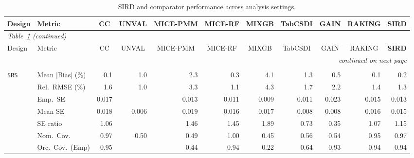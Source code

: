 \begin{landscape}
\footnotesize\setlength{\tabcolsep}{3.5pt}
\begin{longtable}{llrrrrrrrrr}
\caption{SIRD and comparator performance across analysis settings.}
\label{tab:appc_vccc_COX} \\
\toprule
Design & Metric & \multicolumn{1}{c}{CC} & \multicolumn{1}{c}{UNVAL} & \multicolumn{1}{c}{MICE-PMM} & \multicolumn{1}{c}{MICE-RF} & \multicolumn{1}{c}{MIXGB} & \multicolumn{1}{c}{TabCSDI} & \multicolumn{1}{c}{GAIN} & \multicolumn{1}{c}{RAKING} & \multicolumn{1}{c}{\textbf{SIRD}} \\
\midrule \endfirsthead
\multicolumn{11}{l}{\footnotesize\itshape Table~\ref{tab:appc_vccc_COX} (continued)} \\
\toprule
Design & Metric & \multicolumn{1}{c}{CC} & \multicolumn{1}{c}{UNVAL} & \multicolumn{1}{c}{MICE-PMM} & \multicolumn{1}{c}{MICE-RF} & \multicolumn{1}{c}{MIXGB} & \multicolumn{1}{c}{TabCSDI} & \multicolumn{1}{c}{GAIN} & \multicolumn{1}{c}{RAKING} & \multicolumn{1}{c}{\textbf{SIRD}} \\
\midrule \endhead
\midrule \multicolumn{11}{r}{\footnotesize\itshape continued on next page} \\
\endfoot
\bottomrule \endlastfoot
\multicolumn{11}{l}{\textbf{Continuous Phase-Two Covariates}} \\
\addlinespace[2pt]
\quad \texttt{SRS} & Mean $|$Bias$|$ (\%) & \cellcolor{rankone}0.1 & 1.0 & 2.3 & \cellcolor{rankthree}0.3 & 4.1 & 1.3 & 0.5 & \cellcolor{rankone}0.1 & \cellcolor{ranktwo}0.2 \\
 & Rel.\ RMSE (\%) & 1.6 & \cellcolor{rankone}1.0 & 3.3 & \cellcolor{ranktwo}1.1 & 4.3 & 1.7 & 2.2 & 1.4 & \cellcolor{rankthree}1.3 \\
 & Emp.\ SE & 0.017 &  & 0.013 & 0.011 & 0.009 & 0.011 & 0.023 & 0.015 & 0.013 \\
 & Mean SE & 0.018 & 0.006 & 0.019 & 0.016 & 0.017 & 0.008 & 0.008 & 0.016 & 0.015 \\
 & SE ratio & \cellcolor{rankone}1.06 &  & 1.46 & 1.45 & 1.89 & 0.73 & 0.35 & \cellcolor{ranktwo}1.07 & \cellcolor{rankthree}1.15 \\
 & Nom.\ Cov. & \cellcolor{ranktwo}0.97 & 0.50 & 0.49 & \cellcolor{rankthree}1.00 & 0.45 & 0.56 & 0.54 & \cellcolor{rankone}0.95 & \cellcolor{ranktwo}0.97 \\
 & Orc.\ Cov.\ (Emp) & \cellcolor{rankone}0.95 &  & 0.44 & \cellcolor{ranktwo}0.94 & 0.22 & 0.64 & \cellcolor{rankthree}0.93 & \cellcolor{ranktwo}0.94 & \cellcolor{ranktwo}0.94 \\

\end{longtable}
\end{landscape}
